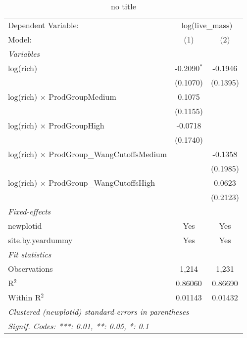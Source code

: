 
\begin{table}[htbp]
   \caption{no title}
   \centering
   \begin{tabular}{lcc}
      \tabularnewline \midrule \midrule
      Dependent Variable: & \multicolumn{2}{c}{log(live\_mass)}\\
      Model:                                            & (1)           & (2)\\  
      \midrule
      \emph{Variables}\\
      log(rich)                                         & -0.2090$^{*}$ & -0.1946\\   
                                                        & (0.1070)      & (0.1395)\\   
      log(rich) $\times$ ProdGroupMedium                & 0.1075        &   \\   
                                                        & (0.1155)      &   \\   
      log(rich) $\times$ ProdGroupHigh                  & -0.0718       &   \\   
                                                        & (0.1740)      &   \\   
      log(rich) $\times$ ProdGroup\_WangCutoffsMedium   &               & -0.1358\\   
                                                        &               & (0.1985)\\   
      log(rich) $\times$ ProdGroup\_WangCutoffsHigh     &               & 0.0623\\   
                                                        &               & (0.2123)\\   
      \midrule
      \emph{Fixed-effects}\\
      newplotid                                         & Yes           & Yes\\  
      site.by.yeardummy                                 & Yes           & Yes\\  
      \midrule
      \emph{Fit statistics}\\
      Observations                                      & 1,214         & 1,231\\  
      R$^2$                                             & 0.86060       & 0.86690\\  
      Within R$^2$                                      & 0.01143       & 0.01432\\  
      \midrule \midrule
      \multicolumn{3}{l}{\emph{Clustered (newplotid) standard-errors in parentheses}}\\
      \multicolumn{3}{l}{\emph{Signif. Codes: ***: 0.01, **: 0.05, *: 0.1}}\\
   \end{tabular}
\end{table}


